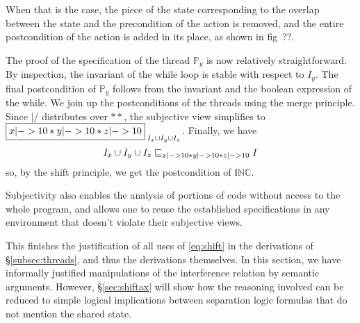 When that is the case, the piece
of the state corresponding to the overlap between the state and the
precondition of the action is removed, and the entire postcondition of
the action is added in its place, as shown in fig~??. 




The proof of the specification of the thread $\mathbb{P}_y$ is 
now relatively straightforward. By inspection, the invariant of the while loop is stable
with respect to $I_y$. The final postcondition of $\mathbb{P}_y$ follows from the
invariant and the boolean expression of the while. We join up the
postconditions of the threads using the merge principle. Since $|/$
distributes over $**$, the subjective view simplifies to $
\shared{x|->10 * y|->10 * z|->10}{I_x\cup I_y\cup I_z} $.
Finally, we have 
\[
I_x\cup I_y\cup I_z\sqsubseteq_{x|->10 * y|->10 * z|->10} I
\]
so, by the shift principle, we get the postcondition of $\mathbb{INC}$. 





Subjectivity also enables the analysis of
portions of code without access to the whole program, and allows one
to reuse the established specifications in any environment that
doesn’t violate their subjective views.


This finishes the justification of all uses of \eqref{eq:shift} in the
derivations of \S\ref{subsec:threads}, and thus the derivations
themselves.  In this section, we have informally justified
manipulations of the interference relation by semantic
arguments. However, \S\ref{sec:shiftax} will show how the reasoning
involved can be reduced to simple logical implications between
separation logic formulas that do not mention the shared state.

